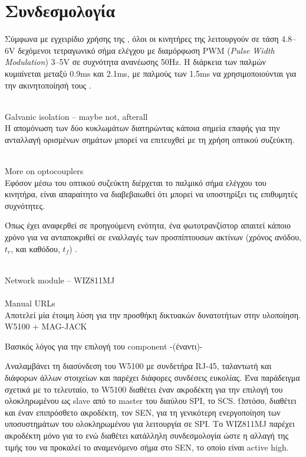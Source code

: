 \chapter{Συνδεσμολογία}

%
%
Σύμφωνα με εγχειρίδιο χρήσης της \textcite{hitec02}, όλοι οι κινητήρες της
λειτουργούν σε τάση 4.8--6V δεχόμενοι τετραγωνικό σήμα ελέγχου με διαμόρφωση
PWM (\textenglish{\emph{Pulse Width Modulation}}) 3--5V σε συχνότητα ανανέωσης
50Hz. Η διάρκεια των παλμών κυμαίνεται μεταξύ 0.9ms και 2.1ms, με παλμούς
των 1.5ms να χρησιμοποιούνται για την ακινητοποίησή τους \parencite{hitec02}.



~\\Galvanic isolation -- maybe not, afterall\\

Η απομόνωση των δύο κυκλωμάτων διατηρώντας κάποια σημεία επαφής για την
ανταλλαγή ορισμένων σημάτων μπορεί να επιτευχθεί με τη χρήση οπτικού συζεύκτη.

~\\More on optocouplers\\

Εφόσον μέσω του οπτικού συζεύκτη διέρχεται το παλμικό σήμα ελέγχου του κινητήρα,
είναι απαραίτητο να διαβεβαιωθεί ότι μπορεί να υποστηρίξει τις επιθυμητές
συχνότητες. ~~~

Όπως έχει αναφερθεί σε προηγούμενη ενότητα, ένα φωτοτρανζίστορ απαιτεί κάποιο
χρόνο για να ανταποκριθεί σε εναλλαγές των προσπίπτουσων ακτίνων (χρόνος ανόδου,
$t_r$, και καθόδου, $t_f$) \nref.

~\\Network module -- WIZ811MJ\\

~\\Manual URLs\\

Αποτελεί μία έτοιμη λύση για την προσθήκη δικτυακών δυνατοτήτων στην υλοποίηση.
W5100 + MAG-JACK

Βασικός λόγος για την επιλογή του component -(έναντι)-

Αναλαμβάνει τη διασύνδεση του W5100 με συνδετήρα RJ-45, ταλαντωτή και διάφορων
άλλων στοιχείων και παρέχει διάφορες συνδέσεις ευκολίας. Ένα παράδειγμα σχετικά
με το τελευταίο, το W5100 διαθέτει έναν
ακροδέκτη για την επιλογή του ολοκληρωμένου ως slave από το master του διαύλου
SPI, το SCS. Ωστόσο, διαθέτει και έναν επιπρόσθετο ακροδέκτη, τον SEN, για τη
γενικότερη ενεργοποίηση των υποσυστημάτων του ολοκληρωμένου για λειτουργία σε
SPI. Το WIZ811MJ παρέχει ακροδέκτη μόνο για το  ενώ διαθέτει κατάλληλη
συνδεσμολογία ώστε η αλλαγή της τιμής του να προκαλεί το αναμενόμενο σήμα στο
SEN, το οποίο είναι active high.

